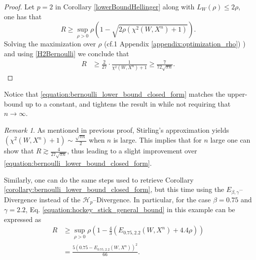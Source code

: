 \documentclass[conference]{IEEEtran}
\theoremstyle{plain}
\theoremstyle{definition}
\theoremstyle{remark}
\newtheorem{remark}{Remark}
\def\arxiv{1}
\begin{document}
\begin{proof}

Let $p=2$ in Corollary \ref{lowerBoundHellinger} along with $L_W(
\rho)\leq 2\rho$, one has that 
\begin{equation}
    R \geq \sup_{\rho>0}\rho \left(1-\sqrt{2\rho(\chi^2(W, X^n)+1)}\right).
\end{equation}
Solving the maximization over $\rho$ (cf.\if\arxiv1 Appendix \ref{appendix:optimization_rho}) \else \cite[Appendix A]{arxiv_version_of_this_paper}\fi) and using \eqref{H2Bernoulli} we conclude that
\begin{align}
    R &\geq \frac{2}{27}\cdot \frac{1}{\chi^2(W, X^n)+1} \geq \frac{7}{72\sqrt{\pi n}}.
\end{align}
\end{proof}
Notice that \eqref{equation:bernoulli_lower_bound_closed_form} matches the upper-bound up to a constant, and tightens the result in \cite[Corollary 2]{bayesRiskRaginsky} while not requiring that $n \to \infty$.
\begin{remark}
As mentioned in previous proof, Stirling's approximation yields $(\chi^2(W, X^n)+1) \sim \frac{\sqrt{\pi n}}{2}$ when $n$ is large. This implies that for $n$ large one can show that
$R \gtrsim \frac{4}{27\sqrt{\pi n}}$, thus leading to a slight improvement over \eqref{equation:bernoulli_lower_bound_closed_form}.
\end{remark}
Similarly, one can do the same steps used to retrieve Corollary \ref{corollary:bernoulli_lower_bound_closed_form}, but this time using the $E_{\beta,\gamma}$--Divergence instead of the $\mathcal{H}_p$--Divergence. In particular, for the case $\beta=0.75$ and $\gamma=2.2$, Eq. \eqref{equation:hockey_stick_general_bound} in this example can be expressed as
\begin{align}
    R &\geq \sup_{\rho>0}\rho\left(1-\frac{4}{3}\left(E_{0.75, 2.2}(W, X^n) + 4.4\rho\right)\right)\\
    &= %
    \frac{5(0.75-E_{0.75, 2.2}(W, X^n))^2}{66}.\label{equation:bernoulli_hockey_stick}
\end{align}
\end{document}
